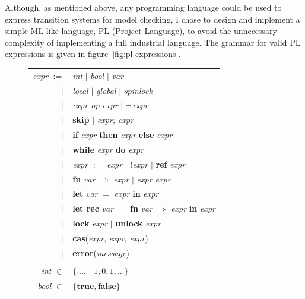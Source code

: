 \documentclass[12pt,a4paper,twoside,openright]{report}
\begin{document}
Although, as mentioned above, any programming language
could be used to express transition systems for model
checking, I chose to design and implement a simple
ML-like language, PL (Project Language), to avoid
the unnecessary complexity of implementing a full
industrial language.
The grammar for valid PL expressions is given in
figure~\ref{fig:pl-expressions}.

\begin{figure}
	\centering
	\setlength{\tabcolsep}{2pt}
	\begin{tabular}{rl}
		\textit{expr} $:=$ & \textit{int} $\vert$ \textit{bool} $\vert$ \textit{var} \\
		$\vert$ & \textit{local} $\vert$ \textit{global}
			$\vert$ \textit{spinlock} \\ 
		$\vert$ & \textit{expr op expr} $\vert$ $\neg\,$\textit{expr} \\
		$\vert$ & \textbf{skip} $\vert$ \textit{expr; expr}\\
		$\vert$ & \textbf{if} \textit{expr}
			\textbf{then} \textit{expr} \textbf{else} \textit{expr} \\
		$\vert$ & \textbf{while} \textit{expr}
			\textbf{do} \textit{expr} \\
		$\vert$ & \textit{expr} $:=$ \textit{expr} $\vert$ !\textit{expr} 
			$\vert$ \textbf{ref} \textit{expr} \\
		$\vert$ & \textbf{fn} \textit{var}
			$\Rightarrow$ \textit{expr} $\vert$ \textit{expr expr} \\
		$\vert$ & \textbf{let} \textit{var} $=$
			\textit{expr} \textbf{in} \textit{expr} \\
		$\vert$ & \textbf{let rec} \textit{var} $=$
			\textbf{fn} \textit{var} $\Rightarrow$
			\textit{expr} \textbf{in} \textit{expr} \\
		$\vert$ & \textbf{lock} \textit{expr} $\vert$
			\textbf{unlock} \textit{expr} \\
		$\vert$ & \textbf{cas}(\textit{expr}, \textit{expr}, \textit{expr}) \\
		$\vert$ & \textbf{error}(\textit{message}) \\
		& \\
		\textit{int} $\in$ & $\{\ldots, -1, 0, 1, \ldots\}$ \\
		\textit{bool} $\in$ & $\{\textbf{true}, \textbf{false}\}$ \\


\end{tabular}
\end{figure}
\end{document}
